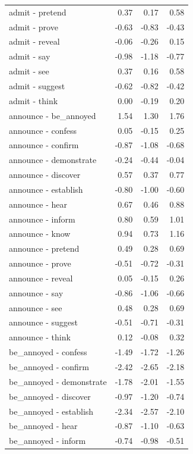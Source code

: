 \begin{longtable}{lrrr}
  admit - pretend & 0.37 & 0.17 & 0.58 \\ 
  admit - prove & -0.63 & -0.83 & -0.43 \\ 
  admit - reveal & -0.06 & -0.26 & 0.15 \\ 
  admit - say & -0.98 & -1.18 & -0.77 \\ 
  admit - see & 0.37 & 0.16 & 0.58 \\ 
  admit - suggest & -0.62 & -0.82 & -0.42 \\ 
  admit - think & 0.00 & -0.19 & 0.20 \\ 
  announce - be_annoyed & 1.54 & 1.30 & 1.76 \\ 
  announce - confess & 0.05 & -0.15 & 0.25 \\ 
  announce - confirm & -0.87 & -1.08 & -0.68 \\ 
  announce - demonstrate & -0.24 & -0.44 & -0.04 \\ 
  announce - discover & 0.57 & 0.37 & 0.77 \\ 
  announce - establish & -0.80 & -1.00 & -0.60 \\ 
  announce - hear & 0.67 & 0.46 & 0.88 \\ 
  announce - inform & 0.80 & 0.59 & 1.01 \\ 
  announce - know & 0.94 & 0.73 & 1.16 \\ 
  announce - pretend & 0.49 & 0.28 & 0.69 \\ 
  announce - prove & -0.51 & -0.72 & -0.31 \\ 
  announce - reveal & 0.05 & -0.15 & 0.26 \\ 
  announce - say & -0.86 & -1.06 & -0.66 \\ 
  announce - see & 0.48 & 0.28 & 0.69 \\ 
  announce - suggest & -0.51 & -0.71 & -0.31 \\ 
  announce - think & 0.12 & -0.08 & 0.32 \\ 
  be_annoyed - confess & -1.49 & -1.72 & -1.26 \\ 
  be_annoyed - confirm & -2.42 & -2.65 & -2.18 \\ 
  be_annoyed - demonstrate & -1.78 & -2.01 & -1.55 \\ 
  be_annoyed - discover & -0.97 & -1.20 & -0.74 \\ 
  be_annoyed - establish & -2.34 & -2.57 & -2.10 \\ 
  be_annoyed - hear & -0.87 & -1.10 & -0.63 \\ 
  be_annoyed - inform & -0.74 & -0.98 & -0.51 \\ 

\end{longtable}

